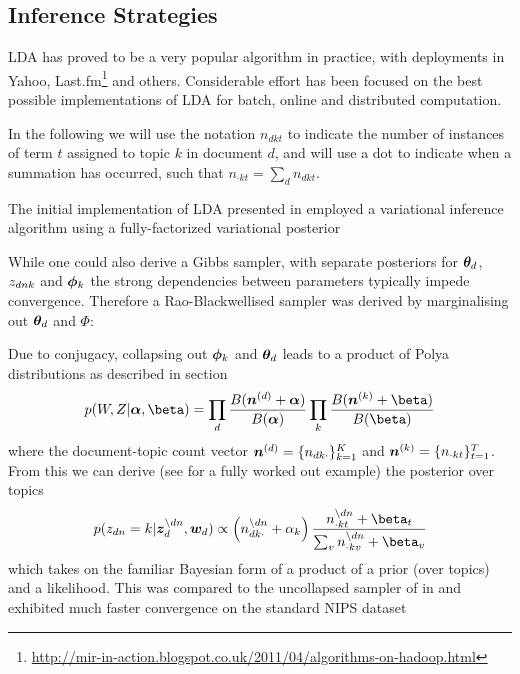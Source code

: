 

\subsection{Inference Strategies}
LDA has proved to be a very popular algorithm in practice, with deployments in Yahoo\cite{Ahmed2011a}, Last.fm\footnote{\url{http://mir-in-action.blogspot.co.uk/2011/04/algorithms-on-hadoop.html}} and others. Considerable effort has been focused on the best possible implementations of LDA for batch, online and distributed computation.

In the following we will use the notation $n_{dkt}$ to indicate the number of instances of term $t$ assigned to topic $k$ in document $d$, and will use a dot to indicate when a summation has occurred, such that $n_{\cdot k t} = \sum_d n_{dkt}$.



The initial implementation of LDA presented in \cite{BleiNgJordan2003} employed a variational inference algorithm using a fully-factorized variational posterior

While one could also derive a Gibbs sampler, with separate posteriors for ${ \bm \theta_d }$, ${ z_{dnk} }$ and ${ \bm \phi_k }$ \cite{Pritchard2000} the strong dependencies between parameters typically impede convergence\cite{CasellaRobert1999}. Therefore \cite{Griffiths2004} a Rao-Blackwellised sampler was derived by marginalising out ${ \bm \theta_d }$ and $\Phi$:

Due to conjugacy, collapsing out ${ \bm \phi_k }$ and ${ \bm \theta_d }$ leads to a product of P\:olya distributions as described in section\begin{align}
p(W,Z|\vv{\alpha},\vv{\beta}) = \prod_d \frac{B(\vv{n}^{(d)} + \vv{\alpha})}{B(\vv{\alpha})} \prod_k \frac{B(\vv{n}^{(k)} + \vv{\beta})}{B(\vv{\beta})}
\end{align}
where the document-topic count vector $\bm n^{(d)} = \{ n_{dk\cdot} \}_{k=1}^K$ and $\bm n^{(k)} = \{ n_{\cdot kt} \}_{t=1}^T$. From this we can derive (see \cite{Heinrich2005} for a fully worked out example) the posterior over topics
\begin{align}
p(z_{dn} = k | \vv{z}_{d}^{\setminus dn}, \vv{w}_d)
\propto
\left(n_{dk\cdot}^{\setminus dn} + \alpha_k \right)
\frac{n_{\cdot kt}^{\setminus dn} + \beta_t}{\sum_v n_{\cdot kv}^{\setminus dn} + \beta_v}
\end{align}
which takes on the familiar Bayesian form of a product of a prior (over topics) and a likelihood. This was compared to the uncollapsed sampler of \cite{Pritchard2000} in \cite{Newman2009} and exhibited much faster convergence on the standard NIPS dataset

